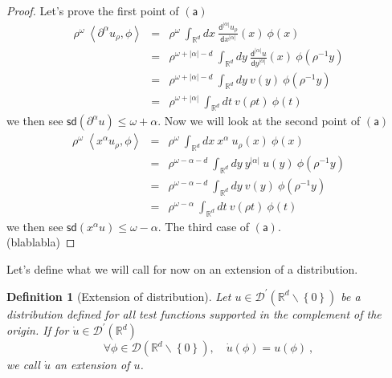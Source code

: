 \documentclass[10pt]{book}
\newcommand{\sd}{\mathsf{sd}}
\newcommand{\abs}[1]{\left|#1\right|}
\newcommand{\sm}[1]{\left\langle#1\right\rangle}
\let\int\int
\newcommand{\Dcal}{\mathcal{D}}
\newcommand{\Rbb}{\mathbb{R}}
\newcommand{\dsf}{\mathsf{d}}
\theoremstyle{break}
\newtheorem{definition}{Definition}
\begin{document}
\begin{proof} 
 Let's prove the first point of $\mathsf{(a)}$
 \begin{eqnarray*}
  \rho^\omega \ \sm{\partial^{\alpha}u_\rho,\phi} &=& \rho^\omega \ \int_{\Rbb^d} dx \ \frac{\dsf^{\abs{\alpha}}u_\rho}{\dsf x^{\abs{\alpha}}}(x) \ \phi(x) \\
  &=& \rho^{\omega+\abs{\alpha}-d} \ \int_{\Rbb^d} dy \ \frac{\dsf^{\abs{\alpha}}u}{\dsf y^{\abs{\alpha}}}(x) \ \phi(\rho^{-1}y) \\
  &=& \rho^{\omega+\abs{\alpha}-d} \ \int_{\Rbb^d} dy \ v(y) \ \phi(\rho^{-1}y) \\
  &=& \rho^{\omega+\abs{\alpha}} \ \int_{\Rbb^d} dt \ v(\rho t) \ \phi(t) 
 \end{eqnarray*}
 we then see $\sd(\partial^\alpha u) \leq \omega + \alpha$. Now we will look at the second point of $\mathsf{(a)}$
 \begin{eqnarray*}
  \rho^\omega \ \sm{x^{\alpha}u_\rho,\phi} &=& \rho^\omega \ \int_{\Rbb^d} dx \ x^{\alpha} \ u_\rho(x) \ \phi(x) \\
  &=& \rho^{\omega-\alpha-d} \ \int_{\Rbb^d} dy \ y^{\abs{\alpha}} \ u(y) \ \phi(\rho^{-1}y) \\
  &=& \rho^{\omega-\alpha-d} \ \int_{\Rbb^d} dy \ v(y) \ \phi(\rho^{-1}y) \\
  &=& \rho^{\omega-\alpha} \ \int_{\Rbb^d} dt \ v(\rho t) \ \phi(t)
 \end{eqnarray*}
 we then see $\sd(x^\alpha u) \leq \omega - \alpha$. The third case of $\mathsf{(a)}$. \\
 (blablabla)

\end{proof}






Let's define what we will call for now on an extension of a distribution.

\begin{definition}[Extension of distribution] 
Let $u \in \Dcal^\prime(\Rbb^d \backslash \left\{ 0\right\} )$ be a distribution defined for all test functions supported in the complement of the origin. If for $\dot{u} \in \Dcal^\prime(\Rbb^d)$
\begin{equation*}
\forall \phi \in \Dcal\left(\Rbb^d \backslash \left\{ 0\right\} \right), \quad \dot{u}(\phi) = u(\phi) \ ,
\end{equation*}
we call $\dot{u}$ an extension of $u$. 
\end{definition}
 
\end{document}
